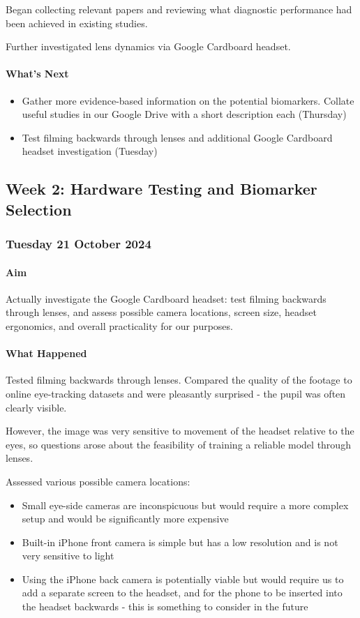 Began collecting relevant papers and reviewing what diagnostic performance had been achieved in existing studies.

Further investigated lens dynamics via Google Cardboard headset.

\paragraph{What's Next}
\begin{itemize}
    \item Gather more evidence-based information on the potential biomarkers. Collate useful studies in our Google Drive with a short description each (Thursday)
    \item Test filming backwards through lenses and additional Google Cardboard headset investigation (Tuesday)
\end{itemize}

\subsection{Week 2: Hardware Testing and Biomarker Selection}

\subsubsection*{Tuesday 21 October 2024}

\paragraph{Aim}
Actually investigate the Google Cardboard headset: test filming backwards through lenses, and assess possible camera locations, screen size, headset ergonomics, and overall practicality for our purposes.

\paragraph{What Happened}
Tested filming backwards through lenses. Compared the quality of the footage to online eye-tracking datasets and were pleasantly surprised - the pupil was often clearly visible.

However, the image was very sensitive to movement of the headset relative to the eyes, so questions arose about the feasibility of training a reliable model through lenses.

Assessed various possible camera locations:
\begin{itemize}
    \item Small eye-side cameras are inconspicuous but would require a more complex setup and would be significantly more expensive
    \item Built-in iPhone front camera is simple but has a low resolution and is not very sensitive to light
    \item Using the iPhone back camera is potentially viable but would require us to add a separate screen to the headset, and for the phone to be inserted into the headset backwards - this is something to consider in the future
\end{itemize}

